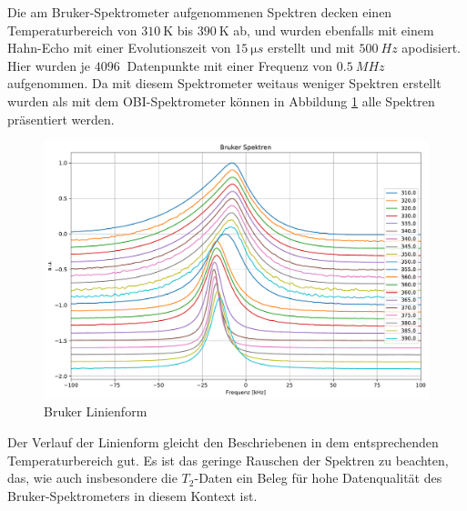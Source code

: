 Die am Bruker-Spektrometer aufgenommenen Spektren decken einen Temperaturbereich von $\SI{310}{\kelvin}$ bis $\SI{390}{\kelvin}$ ab, und wurden ebenfalls mit einem Hahn-Echo mit einer Evolutionszeit von $\SI{15}{\micro s}$ erstellt und mit $\SI{500}{Hz}$ apodisiert. Hier wurden je $\SI{4096}{}$ Datenpunkte mit einer Frequenz von $\SI{0.5}{MHz}$ aufgenommen. Da mit diesem Spektrometer weitaus weniger Spektren erstellt wurden als mit dem OBI-Spektrometer können in Abbildung \ref{fig:res:bruker_linienform} alle Spektren präsentiert werden.
\begin{figure}
	\begin{center}
		\includegraphics[width=\textwidth]{graphics/plots/BRUKER/bruker_lineshape.pdf}
	\end{center}
	\caption{Bruker Linienform} \label{fig:res:bruker_linienform}
\end{figure}
Der Verlauf der Linienform gleicht den Beschriebenen in dem entsprechenden Temperaturbereich gut. Es ist das geringe Rauschen der Spektren zu beachten, das, wie auch insbesondere die $T_2$-Daten ein Beleg für hohe Datenqualität des Bruker-Spektrometers in diesem Kontext ist.

